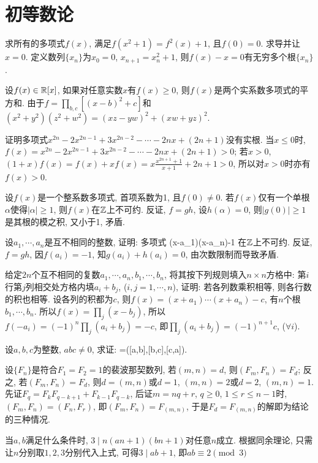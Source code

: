 \chapter{初等数论}
\bq{}{}
求所有的多项式$f(x)$, 满足$f(x^2+1)=f^2(x)+1$, 且$f(0)=0$.
\eq
\ba
求导并让$x=0$.
\ea
\ba
定义数列$\{x_n\}$为$x_0=0$, $x_{n+1}=x_{n}^2+1$, 则$f(x)-x=0$有无穷多个根$\{x_n\}$.
\ea

\bq{}{}
设$f(x)\in\mathbb{R}[x]$, 如果对任意实数$x$有$f(x)\ge0$, 则$f(x)$是两个实系数多项式的平方和.
\eq
\ba
由于$f=\prod_{b,c}\left[(x-b)^2+c\right]$和$(x^2+y^2)(z^2+w^2)=(xz-yw)^2+(xw+yz)^2$.
\ea

\bq{}{}
证明多项式$x^{2n}-2x^{2n-1}+3x^{2n-2}-\cdots-2nx+(2n+1)$没有实根.
\eq
\ba
当$x\le0$时, $f(x)=x^{2n}-2x^{2n-1}+3x^{2n-2}-\cdots-2nx+(2n+1)>0$; 若$x>0$, 
$(1+x)f(x)=f(x)+xf(x)=x\frac{x^{2n+1}+1}{x+1}+2n+1>0$, 所以对$x>0$时亦有$f(x)>0$.
\ea

\bq{}{}
设$f(x)$是一个整系数多项式, 首项系数为1, 且$f(0)\ne0$. 若$f(x)$仅有一个单根$\alpha$使得$|\alpha|\ge1$, 则$f(x)$在$\mathbb{Z}$上不可约.
\eq
\ba
反证, $f=gh$, 设$h(\alpha)=0$, 则$|g(0)|\ge1$是其根的模之积, 又小于1, 矛盾.
\ea

\bq{}{}
设$a_1,\cdots,a_n$是互不相同的整数, 证明: 多项式
\bee
(x-a_1)\cdots(x-a_n)-1
\eee
在$\mathbb{Z}$上不可约.
\eq
\ba
反证, $f=gh$, 因$f(a_i)=-1$, 知$g(a_i)+h(a_i)=0$, 由次数限制而导致矛盾.
\ea

\bq{}{}
给定$2n$个互不相同的复数$a_1, \cdots, a_n, b_1,\cdots, b_n$, 将其按下列规则填入$n\times n$方格中: 
第$i$行第$j$列相交处方格内填$a_i+b_j$, ($i,j=1,\cdots,n$), 证明: 若各列数乘积相等, 则各行数的积也相等.
\eq
\ba
设各列的积都为$c$, 则$f(x)=(x+a_1)\cdots(x+a_n)-c$, 有$n$个根$b_1,\cdots, b_n$.
所以$f(x)=\prod_{j}(x-b_j)$, 所以$f(-a_i)=(-1)^n\prod_{j}(a_{i}+b_j)=-c$,
即$\prod_j(a_i+b_j)=(-1)^{n+1}c$, ($\forall i$).
\ea

\bq{}{}
设$a,b,c$为整数, $abc\ne0$, 求证:
\bee
[(a,b),(b,c),(c,a)]=([a,b],[b,c],[c,a]).
\eee
\eq

\bq{}{}
设$\{F_n\}$是符合$F_1=F_2=1$的裴波那契数列, 若$(m,n)=d$, 则$(F_m,F_n)=F_d$;
反之, 若$(F_m, F_n)=F_d$, 则$d=(m,n)$或$d=1$, $(m,n)=2$或$d=2$, $(m,n)=1$.
\eq
\ba
先证$F_q=F_kF_{q-k+1}+F_{k-1}F_{q-k}$, 后证$m=nq+r$, $q\ge0$, $1\le r\le n-1$时, 
$(F_m,F_n)=(F_n,F_r)$, 即$(F_m,F_n)=F_{(m,n)}$, 于是$F_d=F_{(m,n)}$的解即为结论的三种情况.
\ea

\bq{}{}
当$a,b$满足什么条件时, $3\mid n(an+1)(bn+1)$对任意$n$成立.
\eq
\ba
根据同余理论, 只需让$n$分别取$1,2,3$分别代入上式, 可得$3\mid ab+1$, 即$ab\equiv 2\pmod 3$
\ea

